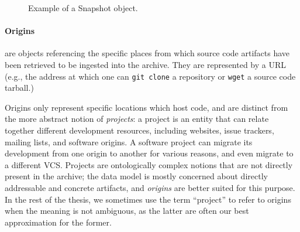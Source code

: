 \begin{figure}[ht]
    \centering
\caption{Example of a Snapshot object.}%
\label{fig:snapshot-example}
\end{figure}



\begin{figure}\centering
{}
\end{figure}
\paragraph{\textbf{Origins}} are objects referencing the specific places from
which source code artifacts have been retrieved to be ingested into the
archive.  They are represented by a URL (e.g., the address at which
one can \texttt{git clone} a repository or \texttt{wget} a source code
tarball.)

Origins only represent specific locations which host code, and are distinct
from the more abstract notion of \emph{projects}: a project is an entity that
can relate together different development resources, including websites, issue
trackers, mailing lists, and software origins. A software project can migrate
its development from one origin to another for various reasons, and even
migrate to a different \gls{VCS}. Projects are ontologically complex notions
that are not directly present in the archive; the data model is mostly
concerned about directly addressable and concrete artifacts, and \emph{origins}
are better suited for this purpose. In the rest of the thesis, we sometimes use
the term ``project'' to refer to origins when the meaning is not ambiguous, as
the latter are often our best approximation for the former.

